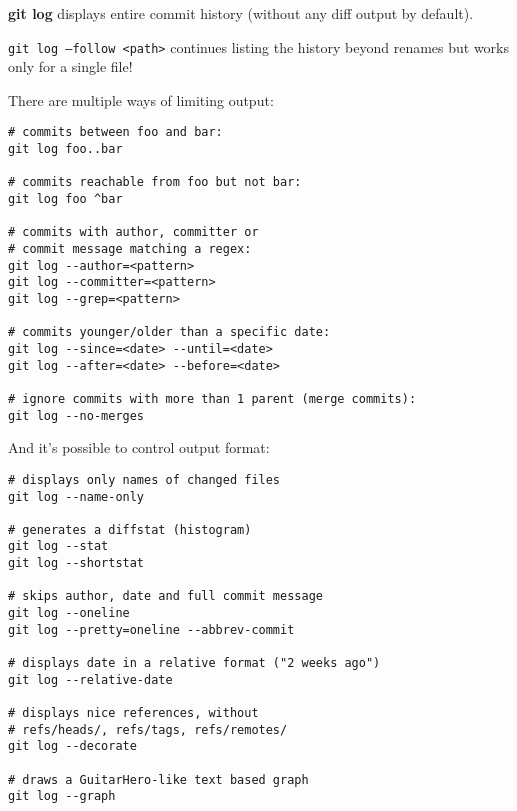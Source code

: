 %

\textbf{git log}\marginpar[\textbf{\color{blue}{log}}]{\textbf{\color{blue}{log}}} displays entire commit history (without any diff output by default).

\texttt{git log --follow <path>} continues listing the history beyond renames but works only for a single file!

There are multiple ways of limiting output:
\begin{verbatim}
# commits between foo and bar:
git log foo..bar

# commits reachable from foo but not bar:
git log foo ^bar

# commits with author, committer or
# commit message matching a regex:
git log --author=<pattern>
git log --committer=<pattern>
git log --grep=<pattern>

# commits younger/older than a specific date:
git log --since=<date> --until=<date>
git log --after=<date> --before=<date>

# ignore commits with more than 1 parent (merge commits):
git log --no-merges
\end{verbatim}

And it's possible to control output format:
\begin{verbatim}
# displays only names of changed files
git log --name-only

# generates a diffstat (histogram)
git log --stat
git log --shortstat

# skips author, date and full commit message
git log --oneline
git log --pretty=oneline --abbrev-commit

# displays date in a relative format ("2 weeks ago")
git log --relative-date

# displays nice references, without
# refs/heads/, refs/tags, refs/remotes/
git log --decorate

# draws a GuitarHero-like text based graph
git log --graph
\end{verbatim}

